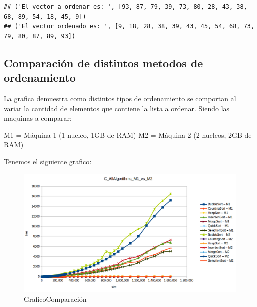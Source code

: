\documentclass[
]{article}
\begin{document}
\begin{verbatim}
## ('El vector a ordenar es: ', [93, 87, 79, 39, 73, 80, 28, 43, 38, 68, 89, 54, 18, 45, 9])
## ('El vector ordenado es: ', [9, 18, 28, 38, 39, 43, 45, 54, 68, 73, 79, 80, 87, 89, 93])
\end{verbatim}

\hypertarget{comparaciuxf3n-de-distintos-metodos-de-ordenamiento}{%
\subsection{Comparación de distintos metodos de
ordenamiento}\label{comparaciuxf3n-de-distintos-metodos-de-ordenamiento}}

La grafica demuestra como distintos tipos de ordenamiento se comportan
al variar la cantidad de elementos que contiene la lista a ordenar.
Siendo las maquinas a comparar:

M1 = Máquina 1 (1 nucleo, 1GB de RAM) M2 = Máquina 2 (2 nucleos, 2GB de
RAM)

Tenemos el siguiente grafico:

\begin{figure}
\centering
\includegraphics{./images/allAlgorithms_M1_M2.png}
\caption{GraficoComparación}
\end{figure}
\end{document}
